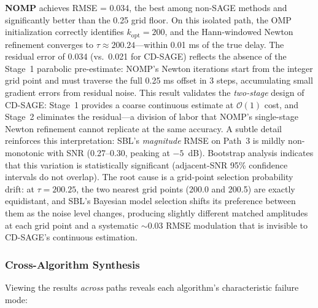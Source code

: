 \documentclass[a4paper,fleqn]{cas-dc}
\begin{document}
\textbf{NOMP} achieves RMSE = 0.034, the best among non-SAGE methods and significantly better than the 0.25 grid floor. On this isolated path, the OMP initialization correctly identifies $k_{\text{opt}} = 200$, and the Hann-windowed Newton refinement converges to $\tau \approx 200.24$---within 0.01 ms of the true delay. The residual error of 0.034 (vs.\ 0.021 for CD-SAGE) reflects the absence of the Stage~1 parabolic pre-estimate: NOMP's Newton iterations start from the integer grid point and must traverse the full 0.25 ms offset in 3 steps, accumulating small gradient errors from residual noise. This result validates the \textit{two-stage} design of CD-SAGE: Stage~1 provides a coarse continuous estimate at $\mathcal{O}(1)$ cost, and Stage~2 eliminates the residual---a division of labor that NOMP's single-stage Newton refinement cannot replicate at the same accuracy. A subtle detail reinforces this interpretation: SBL's \textit{magnitude} RMSE on Path~3 is mildly non-monotonic with SNR (0.27--0.30, peaking at $-5$~dB). Bootstrap analysis indicates that this variation is statistically significant (adjacent-SNR 95\% confidence intervals do not overlap). The root cause is a grid-point selection probability drift: at $\tau=200.25$, the two nearest grid points (200.0 and 200.5) are exactly equidistant, and SBL's Bayesian model selection shifts its preference between them as the noise level changes, producing slightly different matched amplitudes at each grid point and a systematic $\sim$0.03 RMSE modulation that is invisible to CD-SAGE's continuous estimation.

\subsubsection{Cross-Algorithm Synthesis}

Viewing the results \textit{across} paths reveals each algorithm's characteristic failure mode:
\end{document}
